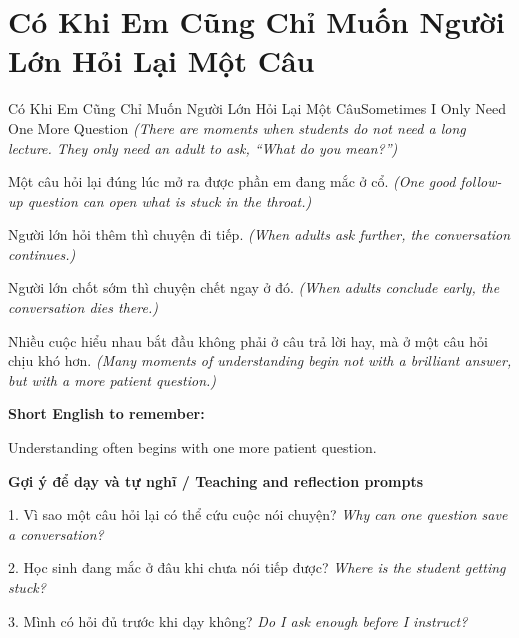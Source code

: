 \section{Có Khi Em Cũng Chỉ Muốn Người Lớn Hỏi Lại Một Câu}
\begin{truyen}{Có Khi Em Cũng Chỉ Muốn Người Lớn Hỏi Lại Một Câu}{Sometimes I Only Need One More Question}
\textit{(There are moments when students do not need a long lecture. They only need an adult to ask, “What do you mean?”)}

Một câu hỏi lại đúng lúc mở ra được phần em đang mắc ở cổ.
\textit{(One good follow-up question can open what is stuck in the throat.)}

Người lớn hỏi thêm thì chuyện đi tiếp.
\textit{(When adults ask further, the conversation continues.)}

Người lớn chốt sớm thì chuyện chết ngay ở đó.
\textit{(When adults conclude early, the conversation dies there.)}

\end{truyen}

\begin{baihoc}
Nhiều cuộc hiểu nhau bắt đầu không phải ở câu trả lời hay, mà ở một câu hỏi chịu khó hơn.
\textit{(Many moments of understanding begin not with a brilliant answer, but with a more patient question.)}
\end{baihoc}

\begin{ghinhoanh}
\textbf{Short English to remember:}

Understanding often begins with one more patient question.

\end{ghinhoanh}

\begin{tuhocnhanh}
\textbf{Gợi ý để dạy và tự nghĩ / Teaching and reflection prompts}

1. Vì sao một câu hỏi lại có thể cứu cuộc nói chuyện? \textit{Why can one question save a conversation?}

2. Học sinh đang mắc ở đâu khi chưa nói tiếp được? \textit{Where is the student getting stuck?}

3. Mình có hỏi đủ trước khi dạy không? \textit{Do I ask enough before I instruct?}
\end{tuhocnhanh}
\ngancach

